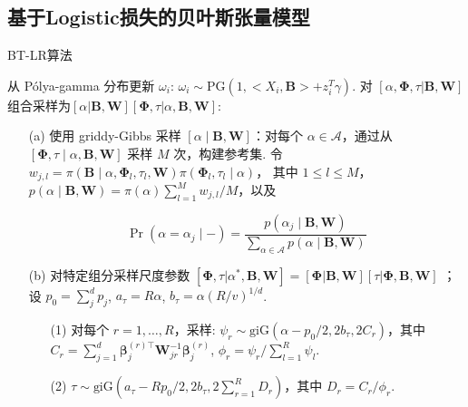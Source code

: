 \documentclass[AutoFakeBold]{LZUThesis}
\begin{document}
\subsection{基于Logistic损失的贝叶斯张量模型}
\begin{algorithm}
	\caption{BT-LR算法}
	\label{Al:BTLR}
	\begin{algorithmic}[1]
		\State 从 Pólya-gamma 分布更新 $\omega_i$: $\omega_i \sim \text{PG}(1, <X_i, \boldsymbol{B}> + z_i^T\gamma)$.
		\State 对 $[\alpha, \boldsymbol{\Phi}, \tau | \boldsymbol{B}, \boldsymbol{W}]$ 组合采样为$[\alpha|\boldsymbol{B},\boldsymbol{W}][\boldsymbol{\Phi},\tau|\alpha, \boldsymbol{B},\boldsymbol{W}]$:
		\begin{itemize}
			\item[(a)] 使用 griddy-Gibbs 采样 \( [\alpha \mid \boldsymbol{B}, \boldsymbol{W}] \)：对每个 \( \alpha \in \mathcal{A} \)，通过从
			\( [\boldsymbol{\Phi}, \tau \mid \alpha, \boldsymbol{B}, \boldsymbol{W}] \) 采样 \( M \) 次，构建参考集.
			令 \( w_{j,l} = \pi(\boldsymbol{B} \mid \alpha, \boldsymbol{\Phi}_l, \tau_l, \boldsymbol{W}) \pi(\boldsymbol{\Phi}_l, \tau_l \mid \alpha) \)，
			其中 \( 1 \leq l \leq M \)，
			\( p(\alpha \mid \boldsymbol{B}, \boldsymbol{W}) = \pi(\alpha) \sum_{l=1}^M w_{j,l}/M \)，以及
			
			\[
			\Pr(\alpha = \alpha_j \mid -) = \frac{p(\alpha_j \mid \boldsymbol{B}, \boldsymbol{W})}{\sum_{\alpha \in \mathcal{A}} p(\alpha \mid \boldsymbol{B}, \boldsymbol{W})}
			\]
			
			\item[(b)] 对特定组分采样尺度参数 $[\boldsymbol{\Phi}, \tau|\alpha^{*},\boldsymbol{B},\boldsymbol{W}] = [\boldsymbol{\Phi}|\boldsymbol{B},\boldsymbol{W}][\tau|\boldsymbol{\Phi,\boldsymbol{B},\boldsymbol{W}}]$
			；设 $p_0 = \sum_j^d p_j$, $a_\tau = R\alpha$, $b_\tau = \alpha(R/v)^{1/d}$.
			\begin{itemize}
				\item [(1)]对每个 $r=1,\dots,R$，采样:
				$\psi_r \sim \text{giG}(\alpha - p_0/2, 2b_\tau, 2C_r)$，其中 $C_r = \sum_{j=1}^d \boldsymbol{\boldsymbol{\beta}}_j^{(r)\top} \boldsymbol{W}_{jr}^{-1} \boldsymbol{\boldsymbol{\beta}}_j^{(r)}$,
				$\phi_r = \psi_r / \sum_{l=1}^R \psi_l$.
				\item [(2)]$\tau \sim \text{giG}(a_\tau - Rp_0/2, 2b_\tau, 2 \sum_{r=1}^R D_r)$，其中 $D_r = C_r/\phi_r$.
			\end{itemize}
		\end{itemize}
		

\end{algorithmic}
\end{algorithm}
\end{document}

